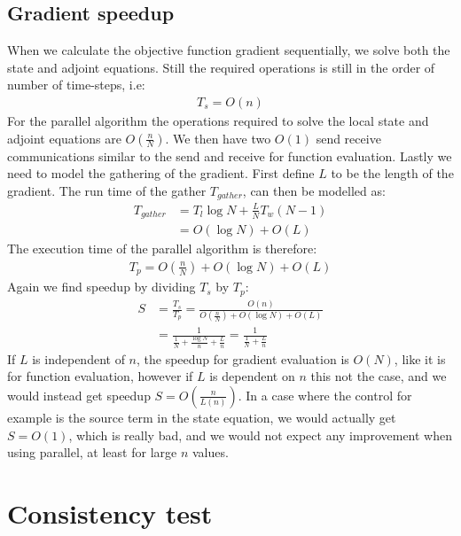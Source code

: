 \subsection{Gradient speedup}
When we calculate the objective function gradient sequentially, we solve both the state and adjoint equations. Still the required operations is still in the order of number of time-steps, i.e:
\begin{align*}
T_s = O(n)
\end{align*}
For the parallel algorithm the operations required to solve the local state and adjoint equations are $O(\frac{n}{N})$. We then have two $O(1)$ send receive communications similar to the send and receive for function evaluation. Lastly we need to model the gathering of the gradient. First define $L$ to be the length of the gradient. The run time of the gather $T_{gather}$, can then be modelled as:
\begin{align*}
T_{gather} &= T_l\log N + \frac{L}{N}T_w(N-1) \\
&= O(\log N) + O(L)
\end{align*}
The execution time of the parallel algorithm is therefore:
\begin{align*}
T_p = O(\frac{n}{N}) + O(\log N) + O(L)
\end{align*}
Again we find speedup by dividing $T_s$ by $T_p$:
\begin{align*}
S &= \frac{T_s}{T_p} = \frac{O(n)}{O(\frac{n}{N}) + O(\log N) + O(L)} \\
&=\frac{1}{\frac{1}{N} + \frac{\log N}{n}+\frac{L}{n}} = \frac{1}{\frac{1}{N} +\frac{L}{n}}
\end{align*}
If $L$ is independent of $n$, the speedup for gradient evaluation is $O(N)$, like it is for function evaluation, however if $L$ is dependent on $n$ this not the case, and we would instead get speedup $S=O(\frac{n}{L(n)})$. In a case where the control for example is the source term in the state equation, we would actually get $S=O(1)$, which is really bad, and we would not expect any improvement when using parallel, at least for large $n$ values.
\section{Consistency test}
